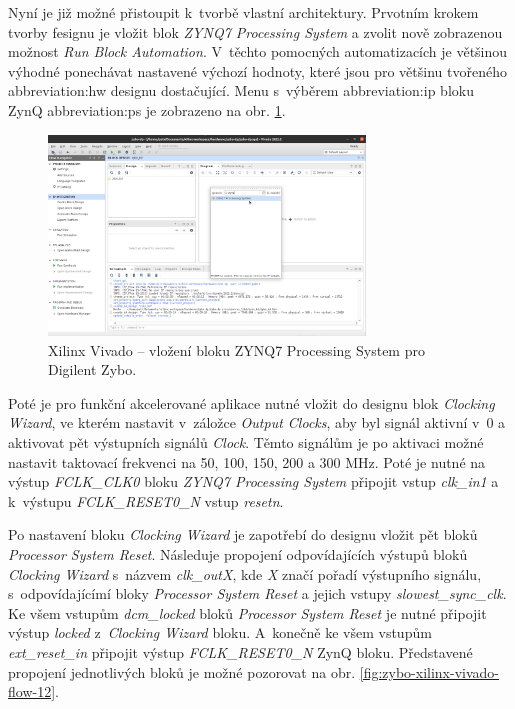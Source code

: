 \documentclass[a4paper, twoside, 11pt]{article}
\begin{document}
\begin{appendices}
		Nyní je již možné přistoupit k~tvorbě vlastní architektury. Prvotním krokem tvorby fesignu je vložit blok \textit{ZYNQ7 Processing System} a zvolit nově zobrazenou možnost \textit{Run Block Automation}. V~těchto pomocných automatizacích je většinou výhodné ponechávat nastavené výchozí hodnoty, které jsou pro většinu tvořeného \gls{abbreviation:hw} designu dostačující. Menu s~výběrem \gls{abbreviation:ip} bloku ZynQ \gls{abbreviation:ps} je zobrazeno na obr. \ref{fig:zybo-xilinx-vivado-flow-07}.

		\begin{figure}[htbp!]
			\centering
			\includegraphics[width=0.75\textwidth]{src/png/zybo-xilinx-vivado-flow/zybo-xilinx-vivado-flow-07.jpg}
			\caption{Xilinx Vivado – vložení bloku ZYNQ7 Processing System pro Digilent Zybo.}
			\label{fig:zybo-xilinx-vivado-flow-07}
		\end{figure}


		Poté je pro funkční akcelerované aplikace nutné vložit do designu blok \textit{Clocking Wizard}, ve kterém nastavit v~záložce \textit{Output Clocks}, aby byl signál aktivní v~0 a aktivovat pět výstupních signálů \textit{Clock}. Těmto signálům je po aktivaci možné nastavit taktovací frekvenci na 50, 100, 150, 200 a 300 MHz. Poté je nutné na výstup \textit{FCLK\_CLK0} bloku \textit{ZYNQ7 Processing System} připojit vstup \textit{clk\_in1} a k~výstupu \textit{FCLK\_RESET0\_N} vstup \textit{resetn}.\par
		Po nastavení bloku \textit{Clocking Wizard} je zapotřebí do designu vložit pět bloků \textit{Processor System Reset}. Následuje propojení odpovídajících výstupů bloků \textit{Clocking Wizard} s~názvem \textit{clk\_outX}, kde \textit{X} značí pořadí výstupního signálu, s~odpovídajícímí bloky \textit{Processor System Reset} a jejich vstupy \textit{slowest\_sync\_clk}. Ke všem vstupům \textit{dcm\_locked} bloků \textit{Processor System Reset} je nutné připojit výstup \textit{locked} z~\textit{Clocking Wizard} bloku. A~konečně ke všem vstupům \textit{ext\_reset\_in} připojit výstup \textit{FCLK\_RESET0\_N} ZynQ bloku. Představené propojení jednotlivých bloků je možné pozorovat na obr. \ref{fig:zybo-xilinx-vivado-flow-12}.


\end{appendices}
\end{document}
